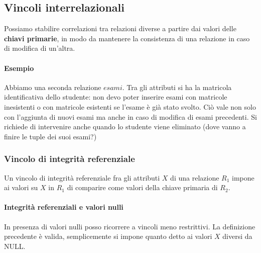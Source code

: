 \subsection{Vincoli interrelazionali}
Possiamo stabilire correlazioni tra relazioni diverse a partire dai valori delle \textbf{chiavi primarie}, in modo da mantenere la consistenza di una relazione in caso di modifica di un'altra.
\paragraph{Esempio} Abbiamo una seconda relazione $esami$. Tra gli attributi si ha la matricola identificativa dello studente: non devo poter inserire esami con matricole inesistenti o con matricole esistenti se l'esame è già stato svolto. Ciò vale non solo con l'aggiunta di nuovi esami ma anche in caso di modifica di esami precedenti. Si richiede di intervenire anche quando lo studente viene eliminato (dove vanno a finire le tuple dei suoi esami?)
\subsubsection{Vincolo di integrità referenziale}
\begin{definizione}
	Un vincolo di integrità referenziale fra gli attributi $X$ di una relazione $R_1$ impone ai valori su $X$ in $R_1$ di comparire come valori della chiave primaria di $R_2$.
\end{definizione}
\paragraph{Integrità referenziali e valori nulli} In presenza di valori nulli posso ricorrere a vincoli meno restrittivi. La definizione precedente è valida, semplicemente si impone quanto detto ai valori $X$ diversi da NULL.
